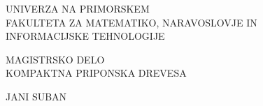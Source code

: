\documentclass[12pt,a4paper,titlepage,openany]{report}
\begin{document}
\pagestyle{empty}
\reversemarginpar
{}

\begin{center}
\vspace{-1cm}
\noindent \large UNIVERZA NA PRIMORSKEM\\
\large FAKULTETA ZA MATEMATIKO, NARAVOSLOVJE IN\\
INFORMACIJSKE TEHNOLOGIJE


\vspace{7.75cm}
\large MAGISTRSKO DELO\\
\vspace{0.3cm}
{\Large  KOMPAKTNA PRIPONSKA DREVESA}\\ %
\vspace{7cm}
\vspace{1.3cm}
\end{center}


\begin{flushright}
\noindent \large JANI SUBAN\\
\vspace{2cm}
\end{flushright}
\end{document}
